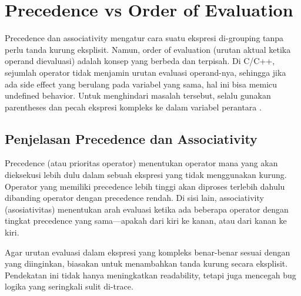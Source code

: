\documentclass[../main.tex]{subfiles}
\begin{document}
\section{Precedence vs Order of Evaluation}
Precedence dan associativity mengatur cara suatu ekspresi di-grouping tanpa perlu tanda kurung eksplisit. Namun, order of evaluation (urutan aktual ketika operand dievaluasi) adalah konsep yang berbeda dan terpisah. Di C/C++, sejumlah operator tidak menjamin urutan evaluasi operand-nya, sehingga jika ada side effect yang berulang pada variabel yang sama, hal ini bisa memicu undefined behavior. Untuk menghindari masalah tersebut, selalu gunakan parentheses dan pecah ekspresi kompleks ke dalam variabel perantara \parencite{gnu-c-manual,cpp-op-precedence,c-op-precedence,c-order-of-eval,cpp-order-of-eval}.

\subsection{Penjelasan Precedence dan Associativity}
Precedence (atau prioritas operator) menentukan operator mana yang akan dieksekusi lebih dulu dalam sebuah ekspresi yang tidak menggunakan kurung. Operator yang memiliki precedence lebih tinggi akan diproses terlebih dahulu dibanding operator dengan precedence rendah. Di sisi lain, associativity (asosiativitas) menentukan arah evaluasi ketika ada beberapa operator dengan tingkat precedence yang sama—apakah dari kiri ke kanan, atau dari kanan ke kiri.

Agar urutan evaluasi dalam ekspresi yang kompleks benar-benar sesuai dengan yang diinginkan, biasakan untuk menambahkan tanda kurung secara eksplisit. Pendekatan ini tidak hanya meningkatkan readability, tetapi juga mencegah bug logika yang seringkali sulit di-trace.
\end{document}
